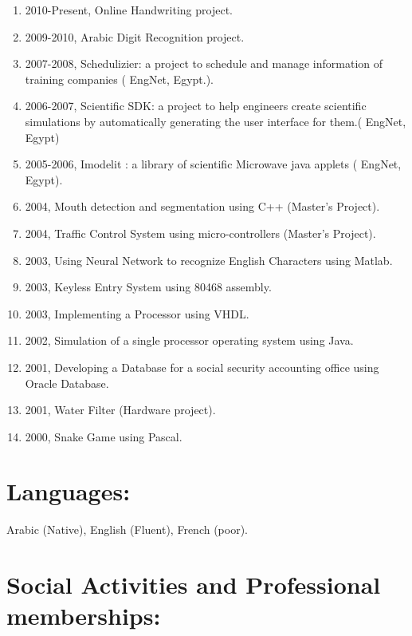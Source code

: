 \documentclass{article}
\begin{document}
 \begin{enumerate}
\item 2010-Present, Online Handwriting project.
 \item 2009-2010, Arabic Digit Recognition project.
\item 2007-2008, Schedulizier: a project to schedule and manage information of
training companies ( EngNet, Egypt.).
 \item 2006-2007, Scientific SDK: a project to help engineers create scientific
 simulations by automatically generating the user interface for them.( EngNet,
 Egypt)
 \item 2005-2006, Imodelit : a library of scientific Microwave java applets (
 EngNet, Egypt).
 \item 2004, Mouth detection and segmentation using C++ (Master's Project).
 \item 2004, Traffic Control System using micro-controllers (Master's
 Project).
 \item 2003, Using Neural Network to recognize English Characters using Matlab.
 \item 2003, Keyless Entry System using 80468 assembly.
 \item 2003, Implementing a Processor using VHDL.
 \item 2002, Simulation of a single processor operating system using Java.
 \item 2001, Developing a Database for a social security accounting office using Oracle Database.
 \item 2001, Water Filter (Hardware project).
 \item 2000, Snake Game using Pascal.
\end{enumerate}



 \section*{Languages:}

Arabic (Native), English (Fluent), French (poor).


 \section*{Social Activities and Professional memberships:}
\end{document}
